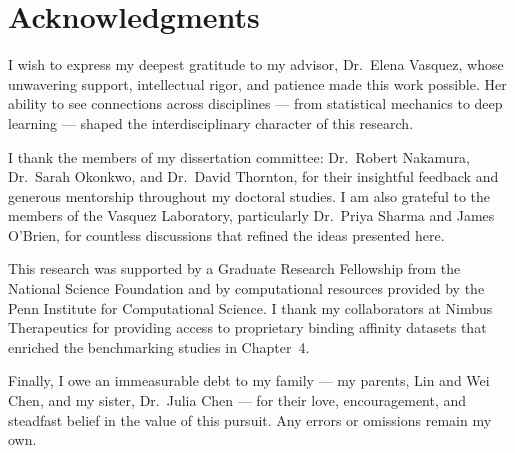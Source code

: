 \chapter*{Acknowledgments}

I wish to express my deepest gratitude to my advisor, Dr.\ Elena Vasquez, whose unwavering support, intellectual rigor, and patience made this work possible. Her ability to see connections across disciplines --- from statistical mechanics to deep learning --- shaped the interdisciplinary character of this research.

I thank the members of my dissertation committee: Dr.\ Robert Nakamura, Dr.\ Sarah Okonkwo, and Dr.\ David Thornton, for their insightful feedback and generous mentorship throughout my doctoral studies. I am also grateful to the members of the Vasquez Laboratory, particularly Dr.\ Priya Sharma and James O'Brien, for countless discussions that refined the ideas presented here.

This research was supported by a Graduate Research Fellowship from the National Science Foundation and by computational resources provided by the Penn Institute for Computational Science. I thank my collaborators at Nimbus Therapeutics for providing access to proprietary binding affinity datasets that enriched the benchmarking studies in Chapter~4.

Finally, I owe an immeasurable debt to my family --- my parents, Lin and Wei Chen, and my sister, Dr.\ Julia Chen --- for their love, encouragement, and steadfast belief in the value of this pursuit. Any errors or omissions remain my own.
